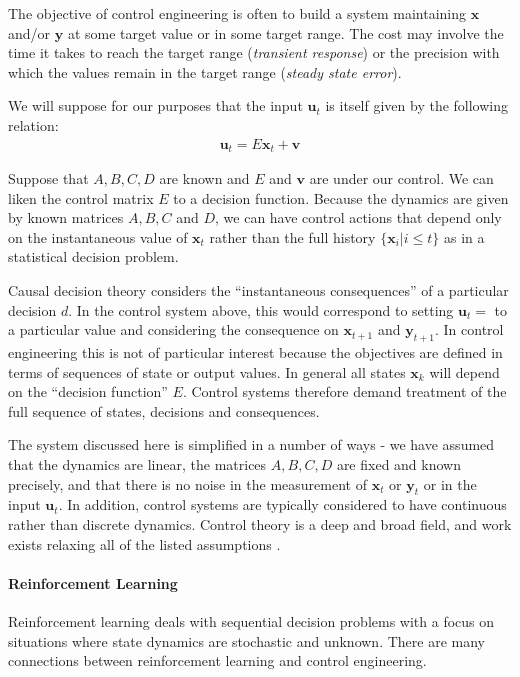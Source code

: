 The objective of control engineering is often to build a system maintaining $\mathbf{x}$ and/or $\mathbf{y}$ at some target value or in some target range. The cost may involve the time it takes to reach the target range (\emph{transient response}) or the precision with which the values remain in the target range (\emph{steady state error}).

We will suppose for our purposes that the input $\mathbf{u}_t$ is itself given by the following relation:
\begin{align}
    \mathbf{u}_t = E\mathbf{x}_t + \mathbf{v}
\end{align}

Suppose that $A, B, C, D$ are known and $E$ and $\mathbf{v}$ are under our control. We can liken the control matrix $E$ to a decision function. Because the dynamics are given by known matrices $A,B,C$ and $D$, we can have control actions that depend only on the instantaneous value of $\mathbf{x}_t$ rather than the full history $\{\mathbf{x}_i|i\leq t\}$ as in a statistical decision problem.

Causal decision theory considers the ``instantaneous consequences'' of a particular decision $d$. In the control system above, this would correspond to setting $\mathbf{u}_t=$ to a particular value and considering the consequence on $\mathbf{x}_{t+1}$ and $\mathbf{y}_{t+1}$. In control engineering this is not of particular interest because the objectives are defined in terms of sequences of state or output values. In general all states $\mathbf{x}_k$ will depend on the ``decision function'' $E$. Control systems therefore demand treatment of the full sequence of states, decisions and consequences.

The system discussed here is simplified in a number of ways - we have assumed that the dynamics are linear, the matrices $A,B,C,D$ are fixed and known precisely, and that there is no noise in the measurement of $\mathbf{x}_t$ or $\mathbf{y}_t$ or in the input $\mathbf{u}_t$. In addition, control systems are typically considered to have continuous rather than discrete dynamics. Control theory is a deep and broad field, and work exists relaxing all of the listed assumptions \cite{stengel_stochastic_1986,kokotovic_foundations_1991}. 

\paragraph{Reinforcement Learning}

Reinforcement learning deals with sequential decision problems with a focus on situations where state dynamics are stochastic and unknown. There are many connections between reinforcement learning and control engineering.


